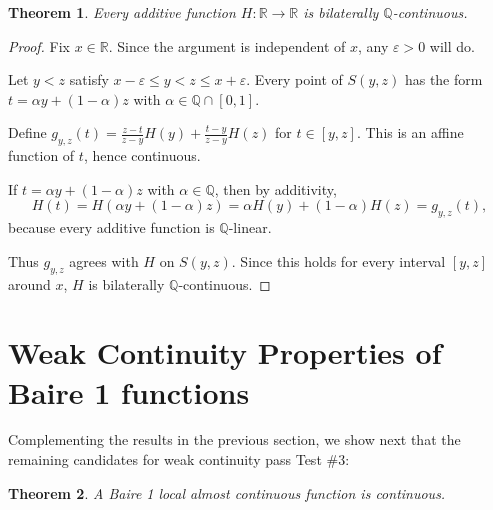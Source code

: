 \documentclass[11pt]{amsart} %
\newtheorem{theorem}{Theorem}[section]
\theoremstyle{definition}
\newcommand{\R}{\mathbb{R}}
\newcommand{\Q}{\mathbb{Q}}
\begin{document}
\begin{theorem} 
Every additive function $H:\R\rightarrow \R$ is bilaterally $\Q$-continuous. 
\end{theorem}
\begin{proof} 
Fix $x\in\mathbb R$. Since the argument is independent of $x$, any $\varepsilon>0$ will do.

Let $y<z$ satisfy $x-\varepsilon\le y<z\le x+\varepsilon$. Every point of $S(y,z)$ has the form
$t=\alpha y+(1-\alpha)z$ with $\alpha\in\mathbb Q\cap[0,1]$.

Define
$g_{y,z}(t)=\frac{z-t}{z-y}H(y)+\frac{t-y}{z-y}H(z)$
for $t\in[y,z]$. This is an affine function of $t$, hence continuous.

If $t=\alpha y+(1-\alpha)z$ with $\alpha\in\mathbb Q$, then by additivity,
\begin{equation} 
H(t)=H(\alpha y+(1-\alpha)z)=\alpha H(y)+(1-\alpha)H(z)=g_{y,z}(t),
\end{equation} 
because every additive function is $\mathbb Q$-linear.

Thus $g_{y,z}$ agrees with $H$ on $S(y,z)$. Since this holds for every interval $[y,z]$ around $x$, $H$ is bilaterally $\Q$-continuous.

\end{proof} 






\section{Weak Continuity Properties of Baire 1 functions} 

Complementing the results in the previous section, we show next that the remaining candidates for weak continuity pass Test \#3:  

\begin{theorem} 
A Baire 1 local almost continuous function is continuous. 
\end{theorem} 
\end{document}
